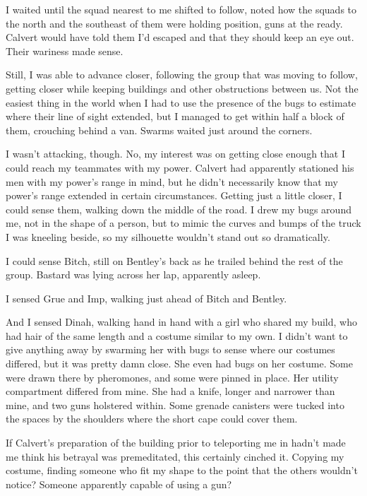 I waited until the squad nearest to me shifted to follow, noted how the squads to the north and the southeast of them were holding position, guns at the ready.  Calvert would have told them I'd escaped and that they should keep an eye out.  Their wariness made sense.



Still, I was able to advance closer, following the group that was moving to follow, getting closer while keeping buildings and other obstructions between us.  Not the easiest thing in the world when I had to use the presence of the bugs to estimate where their line of sight extended, but I managed to get within half a block of them, crouching behind a van.  Swarms waited just around the corners.



I wasn't attacking, though.  No, my interest was on getting close enough that I could reach my teammates with my power.  Calvert had apparently stationed his men with my power's range in mind, but he didn't necessarily know that my power's range extended in certain circumstances.  Getting just a little closer, I could sense them, walking down the middle of the road.  I drew my bugs around me, not in the shape of a person, but to mimic the curves and bumps of the truck I was kneeling beside, so my silhouette wouldn't stand out so dramatically.



I could sense Bitch, still on Bentley's back as he trailed behind the rest of the group.  Bastard was lying across her lap, apparently asleep.



I sensed Grue and Imp, walking just ahead of Bitch and Bentley.



And I sensed Dinah, walking hand in hand with a girl who shared my build, who had hair of the same length and a costume similar to my own.  I didn't want to give anything away by swarming her with bugs to sense where our costumes differed, but it was pretty damn close.  She even had bugs on her costume.  Some were drawn there by pheromones, and some were pinned in place.  Her utility compartment differed from mine.  She had a knife, longer and narrower than mine, and two guns holstered within.  Some grenade canisters were tucked into the spaces by the shoulders where the short cape could cover them.



If Calvert's preparation of the building prior to teleporting me in hadn't made me think his betrayal was premeditated, this certainly cinched it.  Copying my costume, finding someone who fit my shape to the point that the others wouldn't notice?  Someone apparently capable of using a gun?



